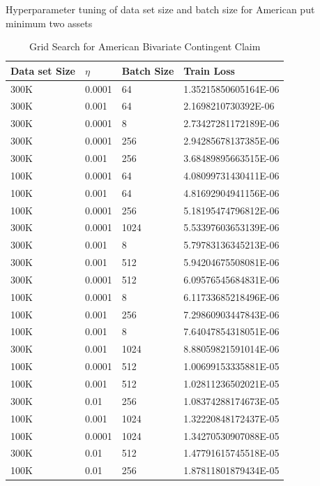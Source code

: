\begin{table}[H]
\caption{Grid Search for American Bivariate Contingent Claim}{Hyperparameter tuning of data set size and batch size for American put minimum two assets}\\
\label{tab:fullhyperAmerMin4}
\centering
\begin{tabular}{llll}
\toprule
\textbf{Data set Size} & \textbf{$\eta$} & \textbf{Batch Size} & \textbf{Train Loss} \\
\midrule
300K     & 0.0001 & 64   & 1.35215850605164E-06 \\ 
300K     & 0.001 & 64   & 2.1698210730392E-06 \\ 
300K     & 0.0001 & 8    & 2.73427281172189E-06 \\ 
300K     & 0.0001 & 256  & 2.94285678137385E-06 \\ 
300K     & 0.001 & 256  & 3.68489895663515E-06 \\ 
100K     & 0.0001 & 64   & 4.08099731430411E-06 \\ 
100K     & 0.001 & 64   & 4.81692904941156E-06 \\ 
100K     & 0.0001 & 256  & 5.18195474796812E-06 \\ 
300K     & 0.0001 & 1024  & 5.53397603653139E-06 \\ 
300K     & 0.001 & 8    & 5.79783136345213E-06 \\ 
300K     & 0.001 & 512  & 5.94204675508081E-06 \\ 
300K     & 0.0001 & 512  & 6.09576545684831E-06 \\ 
100K     & 0.0001 & 8    & 6.11733685218496E-06 \\ 
100K     & 0.001 & 256  & 7.29860903447843E-06 \\ 
100K     & 0.001 & 8    & 7.64047854318051E-06 \\ 
300K     & 0.001 & 1024  & 8.88059821591014E-06 \\ 
100K     & 0.0001 & 512  & 1.00699153335881E-05 \\ 
100K     & 0.001 & 512  & 1.02811236502021E-05 \\ 
300K     & 0.01  & 256  & 1.08374288174673E-05 \\ 
100K     & 0.001 & 1024  & 1.32220848172437E-05 \\ 
100K     & 0.0001 & 1024  & 1.34270530907088E-05 \\ 
300K     & 0.01  & 512  & 1.47791615745518E-05 \\ 
100K     & 0.01  & 256  & 1.87811801879434E-05 \\ 

\end{tabular}
\end{table}
